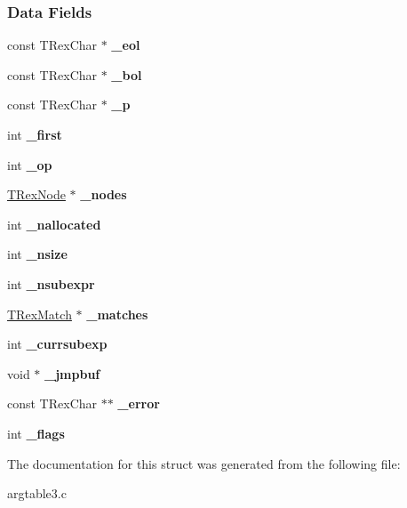 \subsubsection*{Data Fields}
\begin{DoxyCompactItemize}
\item 
\mbox{\label{structTRex_a274f6c4c42ea88341f3a3d8fbe51bf77}} 
const T\+Rex\+Char $\ast$ {\bfseries \+\_\+eol}
\item 
\mbox{\label{structTRex_a728080945e8627daa0c4700b7fb031bb}} 
const T\+Rex\+Char $\ast$ {\bfseries \+\_\+bol}
\item 
\mbox{\label{structTRex_a177d1cad0312711ecd950e2d1e988247}} 
const T\+Rex\+Char $\ast$ {\bfseries \+\_\+p}
\item 
\mbox{\label{structTRex_aacc5ca371e83bcf649594cf12740901b}} 
int {\bfseries \+\_\+first}
\item 
\mbox{\label{structTRex_aec22a5029c705af4d3dde30763beeeb0}} 
int {\bfseries \+\_\+op}
\item 
\mbox{\label{structTRex_aa7fc6649cbdb2c0f06de57bbe8c1c4a3}} 
\hyperlink{structtagTRexNode}{T\+Rex\+Node} $\ast$ {\bfseries \+\_\+nodes}
\item 
\mbox{\label{structTRex_af92121dc1268e3a33c615e94459aab16}} 
int {\bfseries \+\_\+nallocated}
\item 
\mbox{\label{structTRex_a0f06b4807bd70a663a648ab29d6266c6}} 
int {\bfseries \+\_\+nsize}
\item 
\mbox{\label{structTRex_ab7a28e510b4fdeb7920e6828765a12e0}} 
int {\bfseries \+\_\+nsubexpr}
\item 
\mbox{\label{structTRex_a4d6b9a4107f01bf17e39140269a91294}} 
\hyperlink{structTRexMatch}{T\+Rex\+Match} $\ast$ {\bfseries \+\_\+matches}
\item 
\mbox{\label{structTRex_ae7439ae9edb7f5e469962b8b32a6dc25}} 
int {\bfseries \+\_\+currsubexp}
\item 
\mbox{\label{structTRex_a7f65f110bbc4437a1793b6ac125bdaae}} 
void $\ast$ {\bfseries \+\_\+jmpbuf}
\item 
\mbox{\label{structTRex_a2b7c3784b3088fdeee20f074f757800c}} 
const T\+Rex\+Char $\ast$$\ast$ {\bfseries \+\_\+error}
\item 
\mbox{\label{structTRex_aefdff38a9ed9d544fe4a92fed3163981}} 
int {\bfseries \+\_\+flags}
\end{DoxyCompactItemize}


The documentation for this struct was generated from the following file\+:\begin{DoxyCompactItemize}
\item 
argtable3.\+c\end{DoxyCompactItemize}
